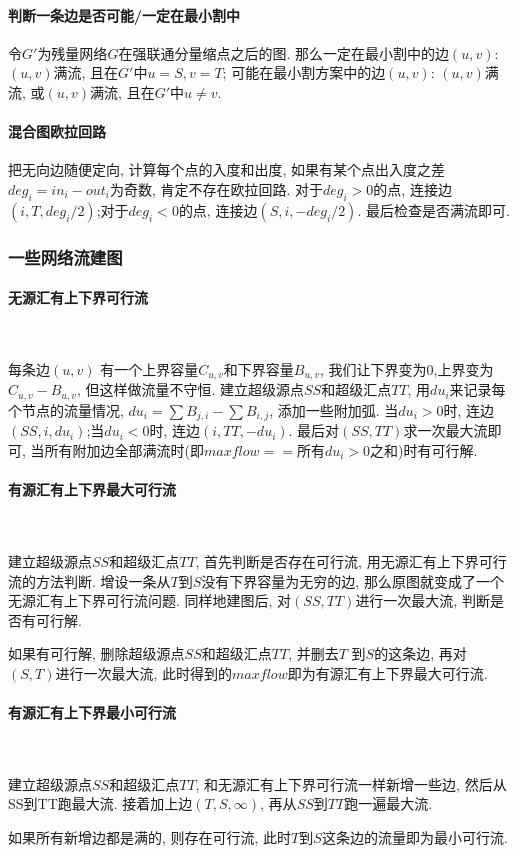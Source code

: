 	\paragraph{判断一条边是否可能/一定在最小割中}令$G'$为残量网络$G$在强联通分量缩点之后的图. 那么一定在最小割中的边$(u,v)$: $(u,v)$满流, 且在$G'$中$u=S,v=T$; 可能在最小割方案中的边$(u,v)$: $(u,v)$满流, 或$(u,v)$满流, 且在$G'$中$u\neq v$. 
	\paragraph{混合图欧拉回路}把无向边随便定向, 计算每个点的入度和出度, 如果有某个点出入度之差$deg_i=in_i-out_i$为奇数, 肯定不存在欧拉回路. 对于$deg_i>0$的点, 连接边$(i,T,deg_i/2)$;对于$deg_i<0$的点, 连接边$(S,i,-deg_i/2)$. 最后检查是否满流即可. 
	\subsubsection{一些网络流建图}
	\paragraph{无源汇有上下界可行流}\
	\par 每条边$(u,v)$ 有一个上界容量$C_{u,v}$和下界容量$B_{u,v}$, 我们让下界变为$0$,上界变为$C_{u,v}-B_{u,v}$, 但这样做流量不守恒. 建立超级源点$SS$和超级汇点$TT$, 用$du_i$来记录每个节点的流量情况, $du_i=\sum B_{j,i}-\sum B_{i,j}$, 添加一些附加弧. 当$du_i>0$时, 连边$(SS,i,du_i)$;当$du_i<0$时, 连边$(i,TT,-du_i)$. 最后对$(SS,TT)$求一次最大流即可, 当所有附加边全部满流时(即$maxflow==所有du_i>0之和$)时有可行解. 
	\paragraph{有源汇有上下界最大可行流}\
	\par 建立超级源点$SS$和超级汇点$TT$, 首先判断是否存在可行流, 用无源汇有上下界可行流的方法判断. 增设一条从$T$到$S$没有下界容量为无穷的边, 那么原图就变成了一个无源汇有上下界可行流问题. 同样地建图后, 对$(SS,TT)$进行一次最大流, 判断是否有可行解. 
	\par 如果有可行解, 删除超级源点$SS$和超级汇点$TT$, 并删去$T$ 到$S$的这条边, 再对$(S,T)$进行一次最大流, 此时得到的$maxflow$即为有源汇有上下界最大可行流. 
	\paragraph{有源汇有上下界最小可行流}\
	\par 建立超级源点$SS$和超级汇点$TT$, 和无源汇有上下界可行流一样新增一些边, 然后从SS到TT跑最大流. 接着加上边$(T,S,\infty)$, 再从$SS$到$TT$跑一遍最大流. 
	\par 如果所有新增边都是满的, 则存在可行流, 此时$T$到$S$这条边的流量即为最小可行流. 
